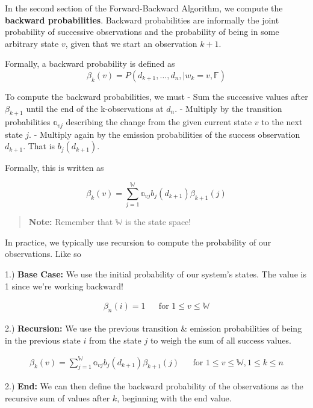 \documentclass[
]{book}
\begin{document}
In the second section of the Forward-Backward Algorithm, we compute the \textbf{backward probabilities}. Backward probabilities are informally the joint probability of successive observations and the probability of being in some arbitrary state \(v\), given that we start an observation \(k+1\).

Formally, a backward probability is defined as
\[\beta_k(v) = P(d_{k+1}, \dots , d_n, \mid w_k = v , \mathbb{F}) \]

To compute the backward probabilities, we must
- Sum the successive values after \(\beta_{k+1}\) until the end of the k-observations at \(d_n\).
- Multiply by the transition probabilities \(\mathbb{a}_{vj}\) describing the change from the given current state \(v\) to the next state \(j\).
- Multiply again by the emission probabilities of the success observation \(d_{k+1}\). That is \(b_j(d_{k+1})\).

Formally, this is written as

\[\beta_k(v) = \sum_{j=1}^\mathbb{W} \mathbb{a}_{vj}b_j(d_{k+1}) \beta_{k+1}(j) \]

\begin{quote}
\textbf{Note:} Remember that \(\mathbb{W}\) is the state space!
\end{quote}

\hfill\break

In practice, we typically use recursion to compute the probability of our observations. Like so

1.) \textbf{Base Case:} We use the initial probability of our system's states. The value is 1 since we're working backward!

\begin{align*}
\beta_n(i) = 1 && \text{for } 1 \leq v \leq \mathbb{W}
\end{align*}

2.) \textbf{Recursion:} We use the previous transition \& emission probabilities of being in the previous state \(i\) from the state \(j\) to weigh the sum of all success values.

\begin{align*}
\beta_k(v) = \sum_{j=1}^\mathbb{W} \mathbb{a}_{vj}b_j(d_{k+1}) \beta_{k+1}(j) && \text{for } 1 \leq v \leq \mathbb{W}, 1 \leq k \leq n
\end{align*}

2.) \textbf{End:} We can then define the backward probability of the observations as the recursive sum of values after \(k\), beginning with the end value.
\end{document}
